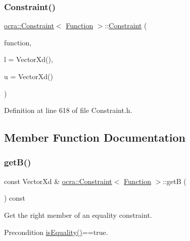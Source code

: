 \subsubsection{\texorpdfstring{Constraint()}{Constraint()}\hspace{0.1cm}{\footnotesize\ttfamily [2/2]}}
{\footnotesize\ttfamily \hyperlink{classocra_1_1Constraint}{ocra\+::\+Constraint}$<$ \hyperlink{classocra_1_1Function}{Function} $>$\+::\hyperlink{classocra_1_1Constraint}{Constraint} (\begin{DoxyParamCaption}\item[{\hyperlink{classocra_1_1Function}{Function} $\ast$}]{function,  }\item[{const Vector\+Xd \&}]{l = {\ttfamily VectorXd()},  }\item[{const Vector\+Xd \&}]{u = {\ttfamily VectorXd()} }\end{DoxyParamCaption})\hspace{0.3cm}{\ttfamily [inline]}}



Definition at line 618 of file Constraint.\+h.



\subsection{Member Function Documentation}
\hypertarget{classocra_1_1Constraint_3_01Function_01_4_a18ee02ca835269c8b648519be8a663ce}{}\label{classocra_1_1Constraint_3_01Function_01_4_a18ee02ca835269c8b648519be8a663ce} 
\subsubsection{\texorpdfstring{get\+B()}{getB()}}
{\footnotesize\ttfamily const Vector\+Xd \& \hyperlink{classocra_1_1Constraint}{ocra\+::\+Constraint}$<$ \hyperlink{classocra_1_1Function}{Function} $>$\+::getB (\begin{DoxyParamCaption}{ }\end{DoxyParamCaption}) const\hspace{0.3cm}{\ttfamily [inline]}}

Get the right member of an equality constraint.

\begin{DoxyPrecond}{Precondition}
\hyperlink{classocra_1_1Constraint_3_01Function_01_4_a3c7d085d888ef8937977129740d4c8a6}{is\+Equality()}==true. 
\end{DoxyPrecond}


